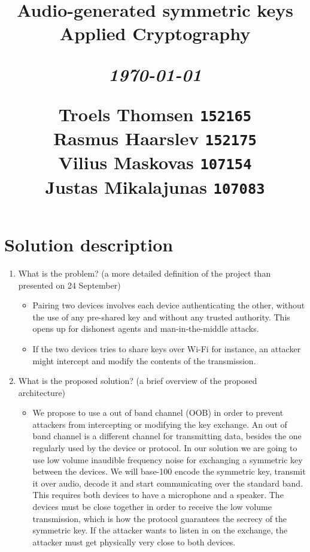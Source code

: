 \documentclass[12pt]{article}
\title{
  \vspace{4cm}
  \begin{flushleft}
  \Large{\textbf{Audio-generated symmetric keys}} \\
  \large{Applied Cryptography}
  \end{flushleft}
  \vspace{0cm}
  \begin{flushleft}
  \small
  \textit{\today}
  \end{flushleft}
  \vspace{12cm}
  \begin{flushleft}
  \small
  Troels Thomsen \texttt{152165} \\
  Rasmus Haarslev \texttt{152175} \\
  Vilius Maskovas \texttt{107154} \\
  Justas Mikalajunas \texttt{107083}\\
  \end{flushleft}
}
\date{
}
\begin{document}
\clearpage
{}
\thispagestyle{empty}
\maketitle

\newpage


\section{Solution description}
\label{sec:Solution description}

\begin{enumerate}
    \item What is the problem?  (a more detailed definition of the project than presented on 24 September)

    \begin{itemize}
        \item Pairing two devices involves each device authenticating the other, without the use of any pre-shared key and without any trusted authority. This opens up for dishonest agents and man-in-the-middle attacks.
        \item If the two devices tries to share keys over Wi-Fi for instance, an attacker might intercept and modify the contents of the transmission.
    \end{itemize}

    \item What is the proposed solution? (a brief overview of the proposed architecture)

    \begin{itemize}
        \item We propose to use a out of band channel (OOB) in order to prevent attackers from intercepting or modifying the key exchange. An out of band channel is a different channel for transmitting data, besides the one regularly used by the device or protocol. In our solution we are going to use low volume inaudible frequency noise for exchanging a symmetric key between the devices.
        We will base-100 encode the symmetric key, transmit it over audio, decode it and start communicating over the standard band.
        This requires both devices to have a microphone and a speaker.
        The devices must be close together in order to receive the low volume transmission, which is how the protocol guarantees the secrecy of the symmetric key. If the attacker wants to listen in on the exchange, the attacker must get physically very close to both devices.
    \end{itemize}


\end{enumerate}
\end{document}

